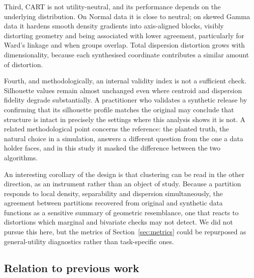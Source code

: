 \documentclass[pdflatex,sn-basic]{sn-jnl}
\begin{document}
Third, CART is not utility-neutral, and its performance depends on the
underlying distribution. On Normal data it is close to neutral; on skewed
Gamma data it hardens smooth density gradients into axis-aligned blocks,
visibly distorting geometry and being associated with lower agreement,
particularly for Ward's linkage and when groups overlap. Total dispersion
distortion grows with dimensionality, because each synthesised coordinate
contributes a similar amount of distortion.

Fourth, and methodologically, an internal validity index is not a sufficient
check. Silhouette values remain almost unchanged even where centroid and
dispersion fidelity degrade substantially. A practitioner who validates a
synthetic release by confirming that its silhouette profile matches the
original may conclude that structure is intact in precisely the settings where
this analysis shows it is not. A related methodological point concerns the
reference: the planted truth, the natural choice in a simulation, answers a
different question from the one a data holder faces, and in this study it
masked the difference between the two algorithms.

An interesting corollary of the design is that clustering can be read in the
other direction, as an instrument rather than an object of study. Because a
partition responds to local density, separability and dispersion
simultaneously, the agreement between partitions recovered from original and
synthetic data functions as a sensitive summary of geometric resemblance, one
that reacts to distortions which marginal and bivariate checks may not detect.
We did not pursue this here, but the metrics of Section~\ref{sec:metrics} could
be repurposed as general-utility diagnostics rather than task-specific ones.

\subsection{Relation to previous work}
\end{document}

